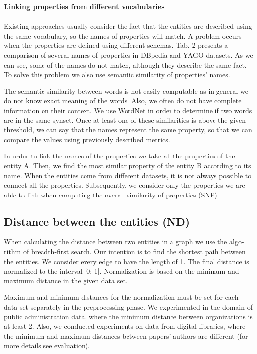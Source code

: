 \documentclass{llncs}
\begin{document}
\textbf{Linking properties from different vocabularies}\\
\vspace{2mm} \\
Existing approaches usually consider the fact that the entities are described
using the same vocabulary, so the names of properties will match. A problem
occurs when the properties are defined using different schemas. Tab. 2 presents
a comparison of several names of properties in DBpedia and YAGO datasets. As
we can see, some of the names do not match, although they describe the same
fact. To solve this problem we also use semantic similarity of properties' names.

The semantic similarity between words is not easily computable as in general we
do not know exact meaning of the words. Also, we often do not have complete
information on their context. We use WordNet in order to determine if two words
are in the same synset. Once at least one of these similarities is above the given
threshold, we can say that the names represent the same property, so that we
can compare the values using previously described metrics.

In order to link the names of the properties we take all the properties of the
entity A. Then, we find the most similar property of the entity B according to its
name. When the entities come from different datasets, it is not always possible
to connect all the properties. Subsequently, we consider only the properties we
are able to link when computing the overall similarity of properties (SNP).

\subsection {Distance between the entities (ND)}
When calculating the distance between two entities in a graph we use the algo-
rithm of breadth-first search. Our intention is to find the shortest path between
the entities. We consider every edge to have the length of 1. The final distance
is normalized to the interval [0; 1]. Normalization is based on the minimum and
maximum distance in the given data set.

Maximum and minimum distances for the normalization must be set for each
data set separately in the preprocessing phase. We experimented in the domain of
public administration data, where the minimum distance between organizations
is at least 2. Also, we conducted experiments on data from digital libraries, where
the minimum and maximum distances between papers' authors are different (for
more details see evaluation).
\end{document}
